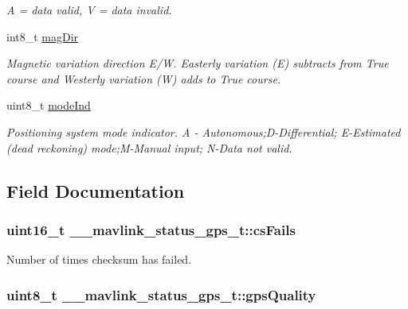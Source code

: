\begin{DoxyCompactItemize}
\begin{DoxyCompactList}\small\item\em A = data valid, V = data invalid. \end{DoxyCompactList}\item 
int8\+\_\+t \hyperlink{struct____mavlink__status__gps__t_afa2fba66d9c86959e3468554871c3393}{mag\+Dir}
\begin{DoxyCompactList}\small\item\em Magnetic variation direction E/\+W. Easterly variation (E) subtracts from True course and Westerly variation (W) adds to True course. \end{DoxyCompactList}\item 
uint8\+\_\+t \hyperlink{struct____mavlink__status__gps__t_a4e700ec21561fc1deaa021942b6cde87}{mode\+Ind}
\begin{DoxyCompactList}\small\item\em Positioning system mode indicator. A -\/ Autonomous;D-\/\+Differential; E-\/\+Estimated (dead reckoning) mode;M-\/\+Manual input; N-\/\+Data not valid. \end{DoxyCompactList}\end{DoxyCompactItemize}


\subsection{Field Documentation}
\hypertarget{struct____mavlink__status__gps__t_a81ba591419b5bac3886e78638b074ade}{
\subsubsection[{cs\+Fails}]{\setlength{\rightskip}{0pt plus 5cm}uint16\+\_\+t \+\_\+\+\_\+mavlink\+\_\+status\+\_\+gps\+\_\+t\+::cs\+Fails}}\label{struct____mavlink__status__gps__t_a81ba591419b5bac3886e78638b074ade}


Number of times checksum has failed. 

\hypertarget{struct____mavlink__status__gps__t_ad31a7b94c10f0c7ad7bc3a65aa00b629}{
\subsubsection[{gps\+Quality}]{\setlength{\rightskip}{0pt plus 5cm}uint8\+\_\+t \+\_\+\+\_\+mavlink\+\_\+status\+\_\+gps\+\_\+t\+::gps\+Quality}}\label{struct____mavlink__status__gps__t_ad31a7b94c10f0c7ad7bc3a65aa00b629}


